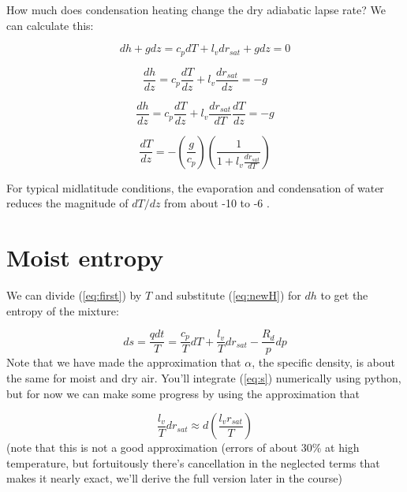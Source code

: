 \documentclass[12pt]{article}
\begin{document}
How much does condensation heating change the dry adiabatic lapse rate?
We can calculate this:

\begin{equation}
  \label{eq:newHsatKR4}
  dh + g dz  = c_p dT + l_v d r_{sat} + g dz = 0
\end{equation}

\begin{equation}
  \label{eq:newHsatKR5}
  \frac{dh}{dz}= c_p \frac{dT}{dz} + l_v \frac{d r_{sat}}{dz} =  -g
\end{equation}

\begin{equation}
  \label{eq:newHsatKR6}
  \frac{dh}{dz}= c_p \frac{dT}{dz} + l_v \frac{d r_{sat}}{dT} \frac{dT}{dz} =  -g
\end{equation}


\begin{equation}
  \label{eq:newHsatKR6b}
 \frac{dT}{dz} = - \left ( \frac{g}{c_p}  \right ) \left ( \frac{1}{1 + l_v \frac{d r_{sat}}{dT}} 
\right ) 
\end{equation}

For typical midlatitude conditions, the evaporation and condensation of water reduces the
magnitude of $dT/dz$ from about -10  to -6 .

\section{Moist entropy}
\label{sec:moist-entropy}


We can divide (\ref{eq:first}) by $T$ and
substitute (\ref{eq:newH}) for $dh$ to get
the entropy of the mixture:

\begin{equation}
  \label{eq:s}
ds = \frac{q dt}{T} = \frac{c_p}{T} dT + \frac{l_v}{T} d r_{sat} - 
\frac{R_d}{p} dp
\end{equation}
Note that we have made the approximation that $\alpha$, the specific density,
is about the same for moist and dry air.  You'll integrate (\ref{eq:s})
numerically using python, but for now we can make some progress by
using the approximation that

\begin{equation}
  \label{eq:lvapprx}
  \frac{l_v}{T} d r_{sat} \approx d \left ( \frac{l_v r_{sat}}{ T} \right )
\end{equation}
(note that this is not a good approximation (errors of about 30\% at high temperature,
but fortuitously there's cancellation in the neglected terms that makes it nearly exact, we'll
derive the full version later in the course)
\end{document}
